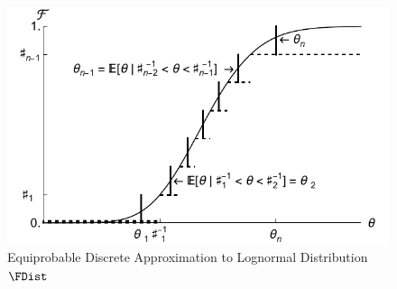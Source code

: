  \hypertarget{discreteApprox}{}
  \begin{figure}
    \includegraphics{./Figures/discreteApprox}
    \caption{Equiprobable Discrete Approximation to Lognormal Distribution $\FDist$}
    \label{fig:discreteapprox}
  \end{figure}

